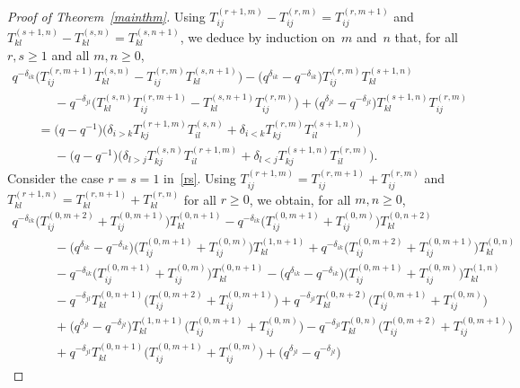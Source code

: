 \documentclass[11pt]{article}
\numberwithin{theorem}{section}
\numberwithin{proposition}{section}
\numberwithin{lemma}{section}
\numberwithin{corollary}{section}
\numberwithin{definition}{section}
\numberwithin{example}{section}
\numberwithin{remark}{section}
\numberwithin{note}{section}
\numberwithin{equation}{section}
\begin{document}
\begin{proof}[Proof of Theorem~\ref{mainthm}]
Using $T_{ij}^{(r+1,m)} - T_{ij}^{(r,m)}=T_{ij}^{(r,m+1)}$ and $T_{kl}^{(s+1,n)} - T_{kl}^{(s,n)}=T_{kl}^{(s,n+1)}$, we
deduce by induction on~$m$ and~$n$ that, for all $r,s \geq 1$ and all $m,n\ge 0$,
\begin{gather}
q^{-\delta_{ik}} \big(T_{ij}^{(r,m+1)}T_{kl}^{(s,n)} - T_{ij}^{(r,m)} T_{kl}^{(s,n+1)} \big) - \big(q^{\delta_{ik}} -
q^{-\delta_{ik}}\big) T_{ij}^{(r,m)} T_{kl}^{(s+1,n)}
\nonumber
\\
\qquad\phantom{=}{}
  - q^{-\delta_{jl}} \big(T_{kl}^{(s,n)} T_{ij}^{(r,m+1)} - T_{kl}^{(s,n+1)} T_{ij}^{(r,m)} \big) + \big(q^{\delta_{jl}} -
q^{-\delta_{jl}}\big) T_{kl}^{(s+1,n)} T_{ij}^{(r,m)}
\nonumber
\\
\qquad
= \big(q-q^{-1}\big) \big(  \delta_{i>k} T_{kj}^{(r+1,m)} T_{il}^{(s,n)} + \delta_{i<k} T_{kj}^{(r,m)} T_{il}^{(s+1,n)}\big)
\nonumber
\\
\qquad\phantom{=}{}
  - \big(q-q^{-1}\big) \big(\delta_{l>j} T_{kj}^{(s,n)} T_{il}^{(r+1,m)} + \delta_{l<j} T_{kj}^{(s+1,n)} T_{il}^{(r,m)} \big).
\label{rs}
\end{gather}
Consider the case $r=s=1$ in~\eqref{rs}.
Using $T_{ij}^{(r+1,m)}=T_{ij}^{(r,m+1)}+T_{ij}^{(r,m)}$ and $T_{kl}^{(r+1,n)}=T_{kl}^{(r,n+1)}+T_{kl}^{(r,n)}$ for all
$r\ge 0$, we obtain, for all $m,n\ge 0$,
\begin{gather*}
  q^{-\delta_{ik}} \big(T_{ij}^{(0,m+2)} + T_{ij}^{(0,m+1)}\big) T_{kl}^{(0,n+1)} -
q^{-\delta_{ik}}\big(T_{ij}^{(0,m+1)} + T_{ij}^{(0,m)}\big) T_{kl}^{(0,n+2)}
\\
\qquad\phantom{=}{}
  - \big(q^{\delta_{ik}} - q^{-\delta_{ik}}\big) \big(T_{ij}^{(0,m+1)} + T_{ij}^{(0,m)}\big) T_{kl}^{(1,n+1)} + q^{-\delta_{ik}}
\big(T_{ij}^{(0,m+2)} + T_{ij}^{(0,m+1)}\big) T_{kl}^{(0,n)}
\\
\qquad\phantom{=}{}
  - q^{-\delta_{ik}}\big(T_{ij}^{(0,m+1)} + T_{ij}^{(0,m)}\big) T_{kl}^{(0,n+1)} - \big(q^{\delta_{ik}} -
q^{-\delta_{ik}}\big)\big(T_{ij}^{(0,m+1)} + T_{ij}^{(0,m)}\big) T_{kl}^{(1,n)}
\\
\qquad\phantom{=}{}
  - q^{-\delta_{jl}} T_{kl}^{(0,n+1)} \big(T_{ij}^{(0,m+2)} + T_{ij}^{(0,m+1)}\big) +
q^{-\delta_{jl}}T_{kl}^{(0,n+2)}\big(T_{ij}^{(0,m+1)} + T_{ij}^{(0,m)}\big)
\\
\qquad\phantom{=}{}
  + \big(q^{\delta_{jl}} - q^{-\delta_{jl}}\big) T_{kl}^{(1,n+1)} \big(T_{ij}^{(0,m+1)} + T_{ij}^{(0,m)}\big) - q^{-\delta_{jl}}
T_{kl}^{(0,n)} \big(T_{ij}^{(0,m+2)} + T_{ij}^{(0,m+1)}\big)
\\
\qquad\phantom{=}{}
  + q^{-\delta_{jl}}T_{kl}^{(0,n+1)} \big(T_{ij}^{(0,m+1)} + T_{ij}^{(0,m)}\big) + \big(q^{\delta_{jl}} - q^{-\delta_{jl}}\big)

\end{gather*}
\end{proof}
\end{document}
